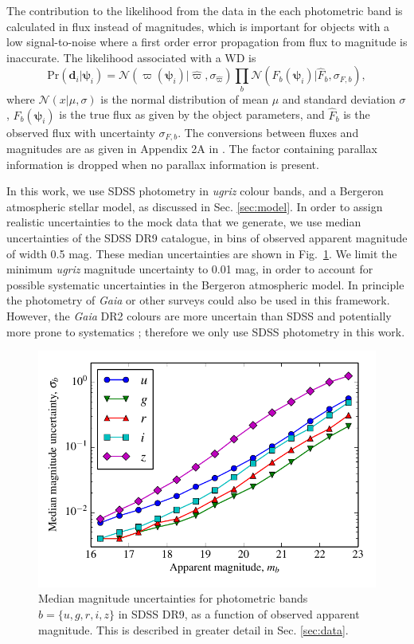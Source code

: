 \documentclass[fleqn,usenatbib]{mnras}
\newcommand{\objp}{\boldsymbol{\psi}}
\newcommand{\data}{\mathbf{d}}
\newcommand{\pr}{\text{Pr}}
\begin{document}
The contribution to the likelihood from the data in the each photometric band 
is calculated in flux instead of magnitudes, which is important for objects with a low signal-to-noise where a first order error propagation from flux to magnitude is inaccurate. The likelihood associated with a WD is
\begin{equation}
\label{eq:likelihood}
\pr(\data_i | \objp_i) = \mathcal{N}(\varpi(\objp_i)|\hat{\varpi},\sigma_{\hat{\varpi}})\prod_{b} \mathcal{N}(F_b(\objp_i)|\hat{F}_b,\sigma_{F,b}),
\end{equation}
where $\mathcal{N}(x | \mu,\sigma)$ is the normal distribution of mean $\mu$ and standard deviation $\sigma$, $F_b(\objp_i)$ is the true flux as given by the object parameters, and $\hat{F}_b$ is the observed flux with uncertainty $\sigma_{F,b}$. The conversions between fluxes and magnitudes are as given in Appendix 2A in \cite{2012MNRAS.419..390M}. The factor containing parallax information is dropped when no parallax information is present.

In this work, we use SDSS photometry in \emph{ugriz} colour bands, and a Bergeron atmospheric stellar model, as discussed in Sec. \ref{sec:model}. In order to assign realistic uncertainties to the mock data that we generate, we use median uncertainties of the SDSS DR9 catalogue, in bins of observed apparent magnitude of width 0.5 mag. These median uncertainties are shown in Fig.~\ref{fig:magnitude_error}. We limit the minimum \emph{ugriz} magnitude uncertainty to 0.01 mag, in order to account for possible systematic uncertainties in the Bergeron atmospheric model. In principle the photometry of \emph{Gaia} or other surveys could also be used in this framework. However, the \emph{Gaia} DR2 colours are more uncertain than SDSS and potentially more prone to systematics \citep{2018A&A...616A...4E}; therefore we only use SDSS photometry in this work.

\begin{figure}
	\includegraphics[width=\columnwidth]{median_app_errors.pdf}
    \caption{Median magnitude uncertainties for photometric bands $b=\{u,g,r,i,z\}$ in SDSS DR9, as a function of observed apparent magnitude. This is described in greater detail in Sec. \ref{sec:data}.}
    \label{fig:magnitude_error}
\end{figure}
\end{document}
